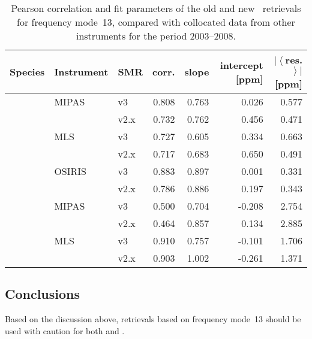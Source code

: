 \begin{table}[hbt]
\centering
\caption{Pearson correlation and fit parameters of the old and new \smr\
retrievals for frequency mode~13, compared with collocated data from other
instruments for the period 2003--2008.
}
\label{tab:fm13:stats}
\begin{tabular}{lllrrrr}
    \toprule
    \textbf{Species} & \textbf{Instrument} & \textbf{SMR} & \textbf{corr.} & \textbf{slope} & \textbf{intercept [ppm]} & \textbf{$\left|\left<\right.\right.$res.$\left.\left.\right>\right|$ [ppm]} \\
    \midrule
    \chem{O3}   & MIPAS     & v3    & 0.808 & 0.763 & 0.026     & 0.577 \\
                &           & v2.x  & 0.732 & 0.762 & 0.456     & 0.471 \\
    \cline{2-7}
                & MLS       & v3    & 0.727 & 0.605 & 0.334     & 0.663 \\
                &           & v2.x  & 0.717 & 0.683 & 0.650     & 0.491 \\
    \cline{2-7}
                & OSIRIS    & v3    & 0.883 & 0.897 & 0.001     & 0.331 \\
                &           & v2.x  & 0.786 & 0.886 & 0.197     & 0.343 \\
    \midrule
    \chem{H_2O} & MIPAS     & v3    & 0.500 & 0.704 & -0.208    & 2.754 \\
                &           & v2.x  & 0.464 & 0.857 & 0.134     & 2.885 \\
    \cline{2-7}
                & MLS       & v3    & 0.910 & 0.757 & -0.101    & 1.706 \\
                &           & v2.x  & 0.903 & 1.002 & -0.261    & 1.371 \\
    \bottomrule
\end{tabular}
\end{table}

\subsection{Conclusions}
\label{sec:fm13:conclusions}
Based on the discussion above, retrievals based on frequency mode~13 should be
used with caution for both \chem{O_3} and \chem{H_2O}.
